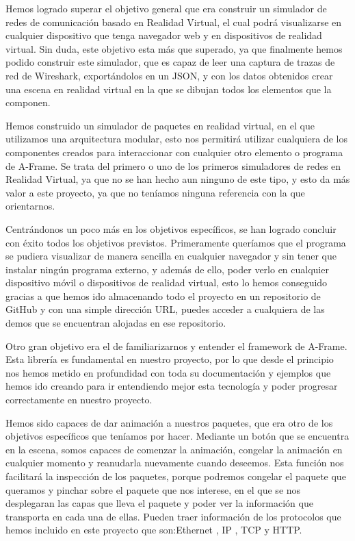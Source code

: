 \documentclass[a4paper, 12pt]{book}
\begin{document}
Hemos logrado superar el objetivo general que era construir un simulador de redes de comunicación basado
en Realidad Virtual, el cual podrá visualizarse en cualquier dispositivo que tenga navegador
web y en dispositivos de realidad virtual. Sin duda, este objetivo esta más que superado, ya que finalmente hemos podido construir este simulador, que es capaz de leer una captura de trazas de red de Wireshark, exportándolos en un JSON, y con los datos obtenidos crear una escena en realidad virtual en la que se dibujan todos los elementos que la componen.

Hemos construido un simulador de paquetes en realidad virtual, en el que utilizamos una arquitectura modular, esto nos permitirá utilizar cualquiera de los componentes creados para interaccionar con cualquier otro elemento o programa de A-Frame. Se trata del primero o uno de los primeros simuladores de redes en Realidad Virtual, ya que no se han hecho aun ninguno de este tipo, y esto da más valor a este proyecto, ya que no teníamos ninguna referencia con la que orientarnos.

Centrándonos un poco más en los objetivos específicos, se han logrado concluir con éxito todos los objetivos previstos. Primeramente queríamos que el programa se pudiera visualizar de manera sencilla en cualquier navegador y sin tener que instalar ningún programa externo, y además de ello, poder verlo en cualquier dispositivo móvil o dispositivos de realidad virtual, esto lo hemos conseguido gracias a que hemos ido almacenando todo el proyecto en un repositorio de GitHub y con una simple dirección URL, puedes acceder a cualquiera de las demos que se encuentran alojadas en ese repositorio.

Otro gran objetivo era el de familiarizarnos y entender el framework de A-Frame. Esta librería es fundamental en nuestro proyecto, por lo que desde el principio nos hemos metido en profundidad con toda su documentación y ejemplos que hemos ido creando para ir entendiendo mejor esta tecnología y poder progresar correctamente en nuestro proyecto.


Hemos sido capaces de dar animación a nuestros paquetes, que era otro de los objetivos específicos que teníamos por hacer. Mediante un botón que se encuentra en la escena, somos capaces de comenzar la animación, congelar la animación en cualquier momento y reanudarla nuevamente cuando deseemos.
Esta función nos facilitará la inspección de los paquetes, porque podremos congelar el paquete que queramos y pinchar sobre el paquete que nos interese, en el que se nos desplegaran las capas que lleva el paquete y poder ver la información que transporta en cada una de ellas. Pueden traer información de los protocolos que hemos incluido en este proyecto que son:Ethernet , IP , TCP y HTTP.
\end{document}
